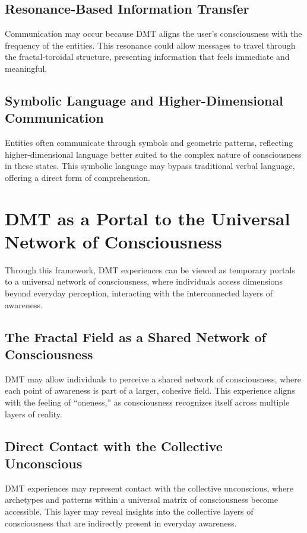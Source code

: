\documentclass{article}
\begin{document}
\subsection{Resonance-Based Information Transfer}
Communication may occur because DMT aligns the user’s consciousness with the frequency of the entities. This resonance could allow messages to travel through the fractal-toroidal structure, presenting information that feels immediate and meaningful.

\subsection{Symbolic Language and Higher-Dimensional Communication}
Entities often communicate through symbols and geometric patterns, reflecting higher-dimensional language better suited to the complex nature of consciousness in these states. This symbolic language may bypass traditional verbal language, offering a direct form of comprehension.

\section{DMT as a Portal to the Universal Network of Consciousness}
Through this framework, DMT experiences can be viewed as temporary portals to a universal network of consciousness, where individuals access dimensions beyond everyday perception, interacting with the interconnected layers of awareness.

\subsection{The Fractal Field as a Shared Network of Consciousness}
DMT may allow individuals to perceive a shared network of consciousness, where each point of awareness is part of a larger, cohesive field. This experience aligns with the feeling of “oneness,” as consciousness recognizes itself across multiple layers of reality.

\subsection{Direct Contact with the Collective Unconscious}
DMT experiences may represent contact with the collective unconscious, where archetypes and patterns within a universal matrix of consciousness become accessible. This layer may reveal insights into the collective layers of consciousness that are indirectly present in everyday awareness.
\end{document}
